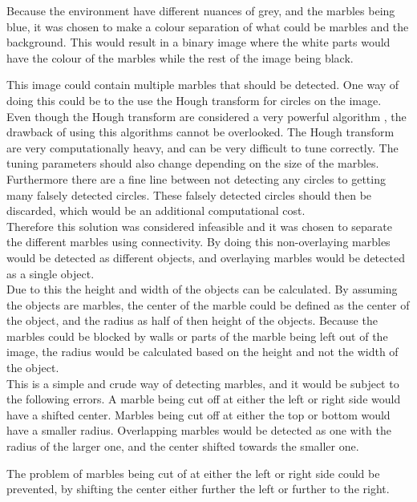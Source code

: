 \documentclass[../Head/Main.tex]{subfiles}
\begin{document}
Because the environment have different nuances of grey, and the marbles being blue, it was chosen to make a colour separation of what could be marbles and the background. This would result in a binary image where the white parts would have the colour of the marbles while the rest of the image being black.\par 
This image could contain multiple marbles that should be detected. One way of doing this could be to the use the Hough transform for circles on the image.\\
Even though the Hough transform are considered a very powerful algorithm , the drawback of using this algorithms cannot be overlooked. The Hough transform are very computationally heavy, and can be very difficult to tune correctly. The tuning parameters should also change depending on the size of the marbles. Furthermore there are a fine line between not detecting any circles to getting many falsely detected circles. These falsely detected circles should then be discarded, which would be an additional computational cost.\\
Therefore this solution was considered infeasible and it was chosen to separate the different marbles using connectivity. By doing this non-overlaying marbles would be detected as different objects, and overlaying marbles would be detected as a single object.\\
Due to this the height and width of the objects can be calculated. By assuming the objects are marbles, the center of the marble could be defined as the center of the object, and the radius as half of then height of the objects. Because the marbles could be blocked by walls or parts of the marble being left out of the image, the radius would be calculated based on the height and not the width of the object.\\
This is a simple and crude way of detecting marbles, and it would be subject to the following errors. A marble being cut off at either the left or right side would have a shifted center. Marbles being cut off at either the top or bottom would have a smaller radius. Overlapping marbles would be detected as one with the radius of the larger one, and the center shifted towards the smaller one.\par 
The problem of marbles being cut of at either the left or right side could be prevented, by shifting the center either further the left or further to the right.
   
 
\end{document}
